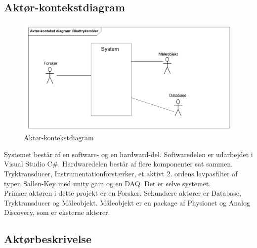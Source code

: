\subsection{Aktør-kontekstdiagram}
\begin{figure}[H]
	\centering
	\includegraphics[width=1\textwidth]{Figurer/Snip20151027_47}
	\caption{Aktør-kontekstdiagram}
	\label{fig:aktoerbeskrivelse}
\end{figure}

Systemet består af en software- og en hardward-del. Softwaredelen er udarbejdet i Visual Studio C\#. Hardwaredelen består af flere komponenter sat sammen. Tryktransducer, Instrumentationforstærker, et aktivt 2. ordens lavpasfilter af typen Sallen-Key med unity gain og en DAQ. Det er selve systemet. \\
Primær aktøren i dette projekt er en Forsker. Sekundære aktører er Database, Tryktransducer og Måleobjekt. Måleobjekt er en package af Physionet og Analog Discovery, som er eksterne aktører.   

\subsection{Aktørbeskrivelse}

